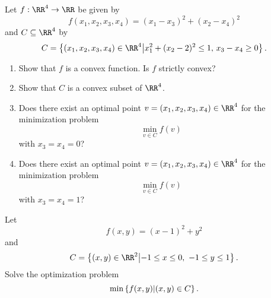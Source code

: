 \documentclass{article}
\begin{document}
\beginshex

  Let $f:\RR^4\rightarrow \RR$ be given by
  \begin{equation*}
    f(x_1, x_2, x_3, x_4) = (x_1 - x_3)^2 + (x_2 - x_4)^2
  \end{equation*}
  and $C\subseteq \RR^4$ by
  \begin{equation*}
    C =\Set{ (x_1, x_2, x_3, x_4)\in \RR^4 }{ x_1^2 + (x_2 - 2)^2 \leq 1,\,
      x_3 -x_4\geq 0 }.
  \end{equation*}
  \begin{enumerate}
  \item Show that $f$ is a convex function. Is $f$ strictly convex?
  \item Show that $C$ is a convex subset of $\RR^4$.
  \item Does there exist an optimal point $v = (x_1, x_2, x_3, x_4)\in
    \RR^4$ for the minimization problem
    \begin{equation*}
      \min_{v\in C} f(v)
    \end{equation*}
    with $x_3 = x_4 = 0$?
  \item Does there exist an optimal point $v = (x_1, x_2, x_3, x_4)\in
    \RR^4$ for the minimization problem
    \begin{equation*}
      \min_{v\in C} f(v)
    \end{equation*}
    with $x_3 = x_4 = 1$?
  \end{enumerate}
\endshex



\beginshex

  Let
  \begin{equation*}
    f(x, y) = (x-1)^2 + y^2
  \end{equation*}
  and
  \begin{equation*}
    C =\Set{ (x, y)\in \RR^2 }{ -1\leq x \leq 0,\,\, -1 \leq y \leq 1 }.
  \end{equation*}
Solve the optimization problem
    \begin{equation*}
      \min\left\{  f(x, y)  \middle|  (x, y)\in C  \right\}.
    \end{equation*}

\endshex

\beginshex
\end{document}
